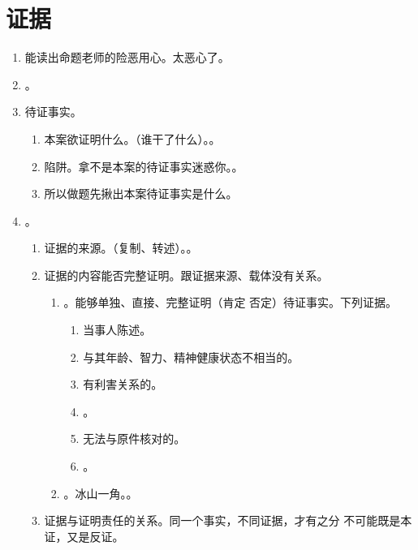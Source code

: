 \section{证据}
\begin{enumerate}
  \item 能读出命题老师的险恶用心。太恶心了。
  \item {}。
  \item 待证事实。
        \begin{enumerate}
          \item 本案欲证明什么。（谁干了什么）。。
          \item 陷阱。拿不是本案的待证事实迷惑你。。
          \item 所以做题先揪出本案待证事实是什么。
        \end{enumerate}
  \item {}。
        \begin{enumerate}
          \item 证据的来源。（复制、转述）。。
          \item 证据的内容能否完整证明。跟证据来源、载体没有关系。
                \begin{enumerate}
                  \item {}。能够单独、直接、完整证明（肯定 \hz 否定）待证事实。下列证据。
                        \begin{enumerate}
                          \item 当事人陈述。
                          \item 与其年龄、智力、精神健康状态不相当的。
                          \item 有利害关系的。
                          \item {}。
                          \item 无法与原件核对的。
                          \item {}。
                        \end{enumerate}
                  \item {}。冰山一角。。
                \end{enumerate}
          \item 证据与证明责任的关系。同一个事实，不同证据，才有之分 \yjt 不可能既是本证，又是反证。

\end{enumerate}
\end{enumerate}
